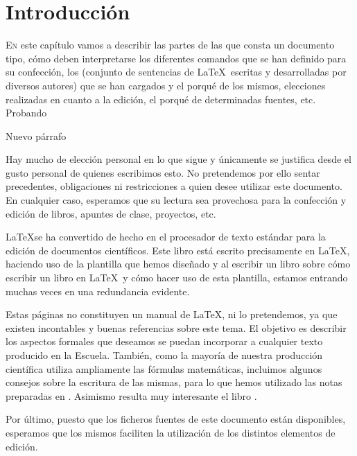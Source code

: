 \chapter{Introducción}\label{chp-01}


\lettrine[lraise=-0.1, lines=2, loversize=0.2]{E}{n} este capítulo vamos a describir las partes 
de las que consta un documento tipo, cómo deben interpretarse los diferentes comandos que se han 
definido para su confección, los  (conjunto de sentencias de \LaTeX\ escritas y 
desarrolladas por diversos autores) que se han cargados y el porqué de los mismos, elecciones 
realizadas en cuanto a la edición, el porqué de determinadas fuentes, etc. Probando

Nuevo párrafo

Hay mucho de elección personal en lo que sigue y únicamente se justifica desde el gusto personal de 
quienes escribimos esto. No pretendemos por ello sentar precedentes, obligaciones ni restricciones 
a quien desee utilizar este documento. En cualquier caso, esperamos que su lectura sea provechosa 
para la confección y edición de libros, apuntes de clase, proyectos, etc.

\LaTeX se ha convertido de hecho en el procesador de texto estándar para la edición de documentos 
científicos. Este libro está escrito precisamente en \LaTeX, haciendo uso de la plantilla que hemos 
diseñado y al escribir un libro sobre cómo escribir un libro en \LaTeX\  y cómo hacer uso de esta 
plantilla, estamos entrando muchas veces en una redundancia evidente.

Estas páginas no constituyen un manual de \LaTeX,  ni lo pretendemos, ya que existen incontables y 
buenas referencias sobre este tema. El objetivo es describir los aspectos formales que deseamos se 
puedan incorporar a cualquier texto producido en la Escuela.  También, como la mayoría de nuestra 
producción científica utiliza ampliamente las fórmulas matemáticas, incluimos algunos consejos sobre 
la escritura de las mismas, para lo que hemos utilizado las notas preparadas en \cite{moser}. Asimismo 
resulta muy interesante el libro \cite{gratzer}.

Por último, puesto que los ficheros fuentes de este documento están disponibles, esperamos que los 
mismos faciliten la utilización de los distintos elementos de edición.

